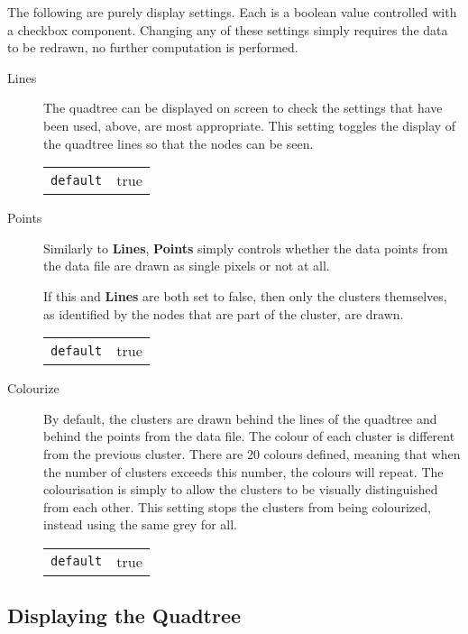 The following are purely display settings. Each is a boolean value controlled
with a checkbox component. Changing any of these settings simply requires the
data to be redrawn, no further computation is performed.

\begin{description}

	\item[Lines] The quadtree can be displayed on screen to check the settings
		that have been used, above, are most appropriate. This setting toggles
		the display of the quadtree lines so that the nodes can be seen.

		\begin{tabular}{r l}
			\texttt{default} & true \\
		\end{tabular}

	\item[Points] Similarly to \textbf{Lines}, \textbf{Points} simply controls
		whether the data points from the data file are drawn as single pixels
		or not at all.

		If this and \textbf{Lines} are both set to false, then only the clusters
		themselves, as identified by the nodes that are part of the cluster,
		are drawn.

		\begin{tabular}{r l}
			\texttt{default} & true \\
		\end{tabular}

	\item[Colourize] By default, the clusters are drawn behind the lines of the
		quadtree and behind the points from the data file. The colour of each
		cluster is different from the previous cluster. There are 20 colours
		defined, meaning that when the number of clusters exceeds this number,
		the colours will repeat. The colourisation is simply to allow the
		clusters to be visually distinguished from each other. This setting
		stops the clusters from being colourized, instead using the same grey
		for all.

		\begin{tabular}{r l}
			\texttt{default} & true \\
		\end{tabular}

\end{description}

\subsection{Displaying the Quadtree}
\label{sub:displaying_the_quadtree}

